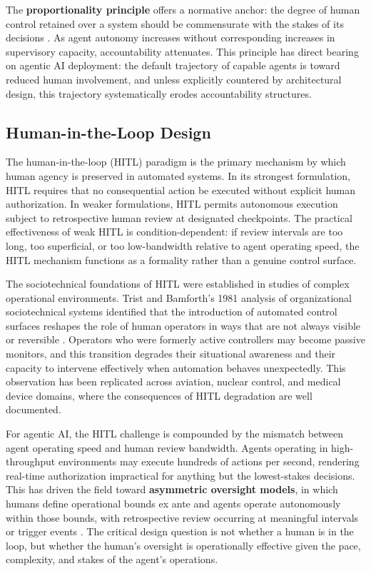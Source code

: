 The \textbf{proportionality principle} offers a normative anchor: the degree of human control retained over a system should be commensurate with the stakes of its decisions \cite{bansal2019}. As agent autonomy increases without corresponding increases in supervisory capacity, accountability attenuates. This principle has direct bearing on agentic AI deployment: the default trajectory of capable agents is toward reduced human involvement, and unless explicitly countered by architectural design, this trajectory systematically erodes accountability structures.

\subsection{Human-in-the-Loop Design}

The human-in-the-loop (HITL) paradigm is the primary mechanism by which human agency is preserved in automated systems. In its strongest formulation, HITL requires that no consequential action be executed without explicit human authorization. In weaker formulations, HITL permits autonomous execution subject to retrospective human review at designated checkpoints. The practical effectiveness of weak HITL is condition-dependent: if review intervals are too long, too superficial, or too low-bandwidth relative to agent operating speed, the HITL mechanism functions as a formality rather than a genuine control surface.

The sociotechnical foundations of HITL were established in studies of complex operational environments. Trist and Bamforth's 1981 analysis of organizational sociotechnical systems identified that the introduction of automated control surfaces reshapes the role of human operators in ways that are not always visible or reversible \cite{tristr81}. Operators who were formerly active controllers may become passive monitors, and this transition degrades their situational awareness and their capacity to intervene effectively when automation behaves unexpectedly. This observation has been replicated across aviation, nuclear control, and medical device domains, where the consequences of HITL degradation are well documented.

For agentic AI, the HITL challenge is compounded by the mismatch between agent operating speed and human review bandwidth. Agents operating in high-throughput environments may execute hundreds of actions per second, rendering real-time authorization impractical for anything but the lowest-stakes decisions. This has driven the field toward \textbf{asymmetric oversight models}, in which humans define operational bounds ex ante and agents operate autonomously within those bounds, with retrospective review occurring at meaningful intervals or trigger events \cite{bansal2019}. The critical design question is not whether a human is in the loop, but whether the human's oversight is operationally effective given the pace, complexity, and stakes of the agent's operations.

